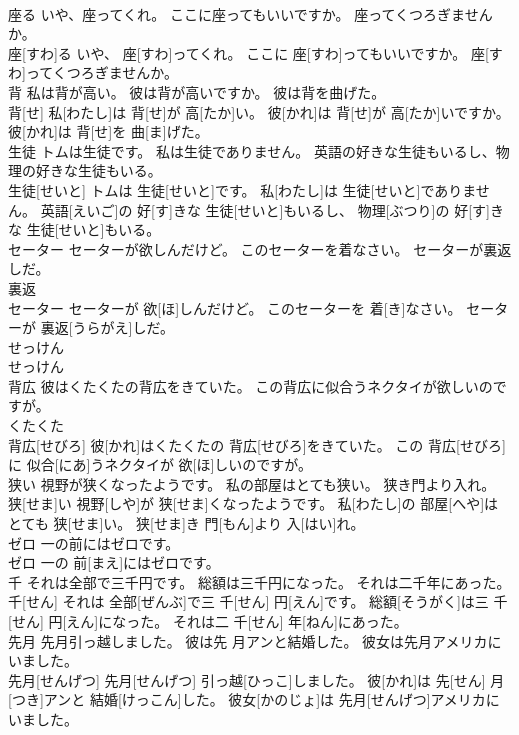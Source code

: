 \documentclass[8pt]{extreport}
\begin{document}
\begin{CJK}{UTF8}{min}
\\	座る いや、座ってくれ。 ここに座ってもいいですか。 座ってくつろぎませんか。	
\\	座[すわ]る いや、 座[すわ]ってくれ。 ここに 座[すわ]ってもいいですか。 座[すわ]ってくつろぎませんか。
\\	背 私は背が高い。 彼は背が高いですか。 彼は背を曲げた。	
\\	背[せ] 私[わたし]は 背[せ]が 高[たか]い。 彼[かれ]は 背[せ]が 高[たか]いですか。 彼[かれ]は 背[せ]を 曲[ま]げた。
\\	生徒 トムは生徒です。 私は生徒でありません。 英語の好きな生徒もいるし、物理の好きな生徒もいる。	
\\	生徒[せいと] トムは 生徒[せいと]です。 私[わたし]は 生徒[せいと]でありません。 英語[えいご]の 好[す]きな 生徒[せいと]もいるし、 物理[ぶつり]の 好[す]きな 生徒[せいと]もいる。
\\	セーター セーターが欲しんだけど。 このセーターを着なさい。 セーターが裏返しだ。	
\\	裏返 
\\	セーター セーターが 欲[ほ]しんだけど。 このセーターを 着[き]なさい。 セーターが 裏返[うらがえ]しだ。
\\	せっけん	
\\	せっけん
\\	背広 彼はくたくたの背広をきていた。 この背広に似合うネクタイが欲しいのですが。	
\\	くたくた 
\\	背広[せびろ] 彼[かれ]はくたくたの 背広[せびろ]をきていた。 この 背広[せびろ]に 似合[にあ]うネクタイが 欲[ほ]しいのですが。
\\	狭い 視野が狭くなったようです。 私の部屋はとても狭い。 狭き門より入れ。	
\\	狭[せま]い 視野[しや]が 狭[せま]くなったようです。 私[わたし]の 部屋[へや]はとても 狭[せま]い。 狭[せま]き 門[もん]より 入[はい]れ。
\\	ゼロ 一の前にはゼロです。	
\\	ゼロ 一の 前[まえ]にはゼロです。
\\	千 それは全部で三千円です。 総額は三千円になった。 それは二千年にあった。	
\\	千[せん] それは 全部[ぜんぶ]で三 千[せん] 円[えん]です。 総額[そうがく]は三 千[せん] 円[えん]になった。 それは二 千[せん] 年[ねん]にあった。
\\	先月 先月引っ越しました。 彼は先 月アンと結婚した。 彼女は先月アメリカにいました。	
\\	先月[せんげつ] 先月[せんげつ] 引っ越[ひっこ]しました。 彼[かれ]は 先[せん] 月[つき]アンと 結婚[けっこん]した。 彼女[かのじょ]は 先月[せんげつ]アメリカにいました。

\end{CJK}
\end{document}
